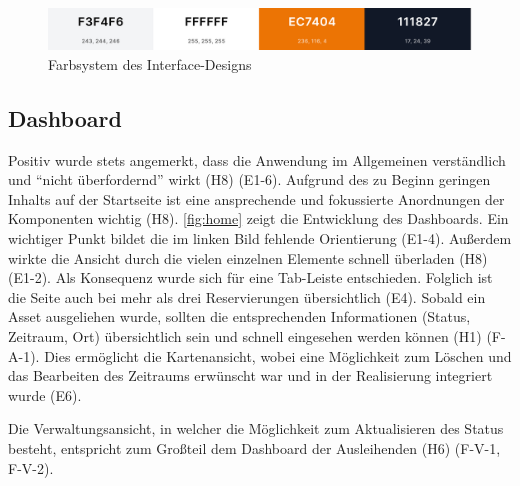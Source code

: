 \begin{figure}[h]
    \centering
    \includegraphics[scale=0.23]{Bilder/farben.png}
    \caption{Farbsystem des Interface-Designs}
    \label{fig:farben}
\end{figure}

\subsection{Dashboard}
Positiv wurde stets angemerkt, dass die Anwendung im Allgemeinen verständlich
und \enquote{nicht überfordernd} wirkt (H8) (E1-6). Aufgrund des zu Beginn geringen
Inhalts auf der Startseite ist eine ansprechende und fokussierte Anordnungen der
Komponenten wichtig (H8). \ref{fig:home} zeigt die Entwicklung des Dashboards.
Ein wichtiger Punkt bildet die im linken Bild fehlende Orientierung (E1-4).
Außerdem wirkte die Ansicht durch die vielen einzelnen Elemente schnell
überladen (H8) (E1-2). Als Konsequenz wurde sich für eine Tab-Leiste entschieden.
Folglich ist die Seite auch bei mehr als drei Reservierungen übersichtlich (E4).
Sobald ein Asset ausgeliehen wurde, sollten die entsprechenden Informationen
(Status, Zeitraum, Ort) übersichtlich sein und schnell eingesehen werden können (H1)
(F-A-1). Dies ermöglicht die Kartenansicht, wobei eine Möglichkeit zum Löschen
und das Bearbeiten des Zeitraums erwünscht war und in der Realisierung
integriert wurde (E6).

Die Verwaltungsansicht, in welcher die Möglichkeit zum Aktualisieren des Status besteht, entspricht
zum Großteil dem Dashboard der Ausleihenden (H6) (F-V-1, F-V-2).

